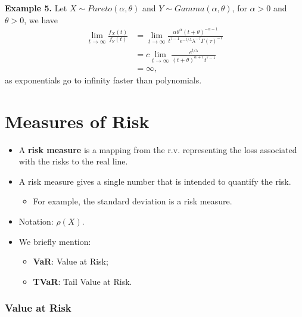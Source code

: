 \documentclass[]{book}
\providecommand{\tightlist}{%
  \setlength{\itemsep}{0pt}\setlength{\parskip}{0pt}}
\theoremstyle{definition}
\theoremstyle{definition}
\theoremstyle{definition}
\theoremstyle{remark}
\begin{document}
\textbf{Example 5.} Let \(X\sim Pareto(\alpha, \theta)\) and
\(Y\sim Gamma(\alpha, \theta)\), for \(\alpha>0\) and \(\theta>0\), we
have \[\begin{aligned}
    \lim_{t\to \infty} \frac{f_{X}(t)}{f_{Y}(t)} &= \lim_{t \to \infty} \frac{\alpha \theta^{\alpha} (t+ \theta)^{-\alpha-1}}{t^{\tau-1} e^{-t/\lambda} \lambda^{-\tau} \Gamma(\tau)^{-1}} \\
    &= c \lim_{t\to \infty} \frac{e^{t/\lambda}}{(t+\theta)^{\alpha+1} t^{\tau-1}} \\
    &= \infty,\end{aligned}\] as exponentials go to infinity faster than
polynomials.

\section{Measures of Risk}\label{measures-of-risk}

\begin{itemize}
\item
  A \textbf{risk measure} is a mapping from the r.v. representing the
  loss associated with the risks to the real line.
\item
  A risk measure gives a single number that is intended to quantify the
  risk.

  \begin{itemize}
  \tightlist
  \item
    For example, the standard deviation is a risk measure.
  \end{itemize}
\item
  Notation: \(\rho(X)\).
\item
  We briefly mention:

  \begin{itemize}
  \item
    \textbf{VaR}: Value at Risk;
  \item
    \textbf{TVaR}: Tail Value at Risk.
  \end{itemize}
\end{itemize}

\subsubsection{Value at Risk}\label{value-at-risk}
\end{document}
